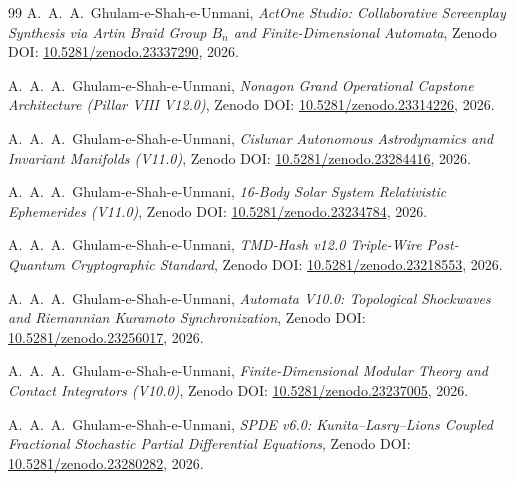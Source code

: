 \documentclass[11pt,a4paper,reqno]{article}
\theoremstyle{plain}
\theoremstyle{definition}
\theoremstyle{remark}
\numberwithin{equation}{section}
\numberwithin{table}{section}
\begin{document}
\begin{thebibliography}{99}
A.~A.~A.~Ghulam-e-Shah-e-Unmani, \emph{ActOne Studio: Collaborative Screenplay Synthesis via Artin Braid Group $B_n$ and Finite-Dimensional Automata}, Zenodo DOI: \href{https://doi.org/10.5281/zenodo.23337290}{10.5281/zenodo.23337290}, 2026.

A.~A.~A.~Ghulam-e-Shah-e-Unmani, \emph{Nonagon Grand Operational Capstone Architecture (Pillar VIII V12.0)}, Zenodo DOI: \href{https://doi.org/10.5281/zenodo.23314226}{10.5281/zenodo.23314226}, 2026.

A.~A.~A.~Ghulam-e-Shah-e-Unmani, \emph{Cislunar Autonomous Astrodynamics and Invariant Manifolds (V11.0)}, Zenodo DOI: \href{https://doi.org/10.5281/zenodo.23284416}{10.5281/zenodo.23284416}, 2026.

A.~A.~A.~Ghulam-e-Shah-e-Unmani, \emph{16-Body Solar System Relativistic Ephemerides (V11.0)}, Zenodo DOI: \href{https://doi.org/10.5281/zenodo.23234784}{10.5281/zenodo.23234784}, 2026.

A.~A.~A.~Ghulam-e-Shah-e-Unmani, \emph{TMD-Hash v12.0 Triple-Wire Post-Quantum Cryptographic Standard}, Zenodo DOI: \href{https://doi.org/10.5281/zenodo.23218553}{10.5281/zenodo.23218553}, 2026.

A.~A.~A.~Ghulam-e-Shah-e-Unmani, \emph{Automata V10.0: Topological Shockwaves and Riemannian Kuramoto Synchronization}, Zenodo DOI: \href{https://doi.org/10.5281/zenodo.23256017}{10.5281/zenodo.23256017}, 2026.

A.~A.~A.~Ghulam-e-Shah-e-Unmani, \emph{Finite-Dimensional Modular Theory and Contact Integrators (V10.0)}, Zenodo DOI: \href{https://doi.org/10.5281/zenodo.23237005}{10.5281/zenodo.23237005}, 2026.

A.~A.~A.~Ghulam-e-Shah-e-Unmani, \emph{SPDE v6.0: Kunita--Lasry--Lions Coupled Fractional Stochastic Partial Differential Equations}, Zenodo DOI: \href{https://doi.org/10.5281/zenodo.23280282}{10.5281/zenodo.23280282}, 2026.

\end{thebibliography}
\end{document}

